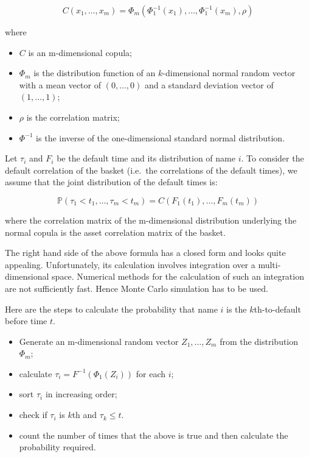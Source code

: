 \documentclass[11pt]{article}
\makeatletter
\providecommand{\tightlist}{%
      \setlength{\itemsep}{0pt}\setlength{\parskip}{0pt}}
\newcommand{\boxspacing}{\kern\kvtcb@left@rule\kern\kvtcb@boxsep}
\newcommand{\prompt}[4]{
        \ttfamily\llap{{\color{#2}[#3]:\hspace{3pt}#4}}\vspace{-\baselineskip}
    }
\makeatother
\begin{document}
\[C(x_1,\ldots,x_m) = \Phi_m(\Phi^{-1}_1(x_1),\ldots,\Phi^{-1}_1(x_m), \rho) \]

where

\begin{itemize}
\tightlist
\item
  \(C\) is an m-dimensional copula;
\item
  \(\Phi_m\) is the distribution function of an \(k\)-dimensional normal
  random vector with a mean vector of \((0,\ldots,0)\) and a standard
  deviation vector of \((1,\dots,1)\);
\item
  \(\rho\) is the correlation matrix;
\item
  \(\Phi^{-1}\) is the inverse of the one-dimensional standard normal
  distribution.
\end{itemize}

Let \(\tau_i\) and \(F_i\) be the default time and its distribution of
name \(i\). To consider the default correlation of the basket (i.e.~the
correlations of the default times), we assume that the joint
distribution of the default times is:

\[\mathbb{P}(\tau_1 <t_1,\ldots, \tau_m <t_m) = C(F_1(t_1),\ldots, F_m(t_m))\]

where the correlation matrix of the m-dimensional distribution
underlying the normal copula is the asset correlation matrix of the
basket.

The right hand side of the above formula has a closed form and looks
quite appealing. Unfortunately, its calculation involves integration
over a multi-dimensional space. Numerical methods for the calculation of
such an integration are not sufficiently fast. Hence Monte Carlo
simulation has to be used.

Here are the steps to calculate the probability that name \(i\) is the
\(k\)th-to-default before time \(t\).

\begin{itemize}
\tightlist
\item
  Generate an m-dimensional random vector \(Z_1,\ldots,Z_m\) from the
  distribution \(\Phi_m\);
\item
  calculate \(\tau_i=F^{-1}(\Phi_1(Z_i))\) for each \(i\);
\item
  sort \(\tau_i\) in increasing order;
\item
  check if \(\tau_i\) is \(k\)th and \(\tau_k \le t\).
\item
  count the number of times that the above is true and then calculate
  the probability required.
\end{itemize}

    \begin{tcolorbox}[breakable, size=fbox, boxrule=1pt, pad at break*=1mm,colback=cellbackground, colframe=cellborder]
\prompt{In}{incolor}{ }{\boxspacing}
\begin{Verbatim}[commandchars=\\\{\}]

\end{Verbatim}
\end{tcolorbox}


    
    
    
\end{document}
